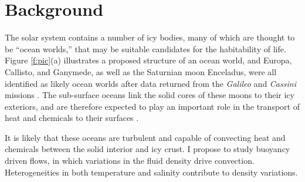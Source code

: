 \documentclass[12pt]{article}
\begin{document}
\section{Background}
The solar system contains a number of icy bodies, many of which are thought to be ``ocean worlds,'' that may be suitable candidates for the habitability of life.
Figure \ref{f:pic}(a) illustrates a proposed structure of an ocean world, and
Europa, Callisto, and Ganymede, as well as the Saturnian moon Enceladus, were all identified as likely ocean worlds after data returned from the \textit{Galileo} and \textit{Cassini} missions \citep{fN16}.
The sub-surface oceans link the solid cores of these moons to their icy exteriors, and are therefore expected to play an important role in the transport of heat and chemicals to their surfaces \citep{kS20}. 


It is likely that these oceans are turbulent and capable of convecting heat and chemicals between the solid interior and icy crust.
I propose to study buoyancy driven flows, in which variations in the fluid density drive convection.
Heterogeneities in both temperature and salinity contribute to density variations.
\end{document}
